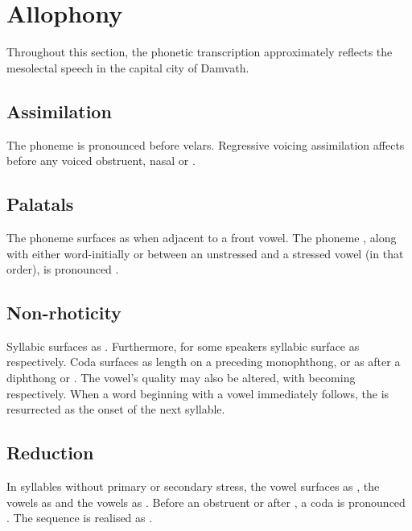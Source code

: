 \section{Allophony}\label{sec:allophony}
Throughout this section, the phonetic transcription approximately reflects the mesolectal speech in the capital city of Damvath.

\subsection{Assimilation}
The phoneme  is pronounced  before velars.
Regressive voicing assimilation affects  before any voiced obstruent, nasal or .

\subsection{Palatals}
The phoneme  surfaces as  when adjacent to a front vowel.
The phoneme , along with  either word-initially or between an unstressed and a stressed vowel (in that order), is pronounced .
    
\subsection{Non-rhoticity}
Syllabic  surfaces as . Furthermore, for some speakers syllabic  surface as  respectively.
Coda  surfaces as length on a preceding monophthong, or as  after a diphthong or . The vowel's quality may also be altered, with  becoming  respectively.
When a word beginning with a vowel immediately follows, the  is resurrected as the onset of the next syllable.

\subsection{Reduction}
In syllables without primary or secondary stress, the vowel  surfaces as , the vowels  as  and the vowels  as .
Before an obstruent or after , a coda  is pronounced .
The sequence  is realised as .

